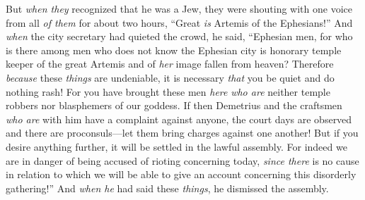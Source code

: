 \begin{biblechapter}
\verse But \textit{when they} recognized that he was a Jew, they were shouting with one voice from all \textit{of them} for about two hours, “Great \textit{is} Artemis of the Ephesians!”
\verse And \textit{when} the city secretary had quieted the crowd, he said, “Ephesian men, for who is there among men who does not know the Ephesian city is honorary temple keeper of the great Artemis and of \textit{her} image fallen from heaven?
\verse Therefore \textit{because} these \textit{things} are undeniable, it is necessary \textit{that} you be quiet and do nothing rash!
\verse For you have brought these men \textit{here} \textit{who are} neither temple robbers nor blasphemers of our goddess.
\verse If then Demetrius and the craftsmen \textit{who are} with him have a complaint against anyone, the court days are observed and there are proconsuls—let them bring charges against one another!
\verse But if you desire anything further, it will be settled in the lawful assembly.
\verse For indeed we are in danger of being accused of rioting concerning today, \textit{since there} is no cause in relation to which we will be able to give an account concerning this disorderly gathering!” And \textit{when he} had said these \textit{things}, he dismissed the assembly.
\end{biblechapter}

